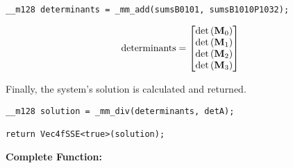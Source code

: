 \begin{verbatim}
__m128 determinants = _mm_add(sumsB0101, sumsB1010P1032);
\end{verbatim}


\begin{align*}
\mathrm{determinants} 
=
\begin{bmatrix}
\mathrm{det}\left(\mathbf{M}_0\right)\\
\mathrm{det}\left(\mathbf{M}_1\right)\\
\mathrm{det}\left(\mathbf{M}_2\right)\\
\mathrm{det}\left(\mathbf{M}_3\right)\\
\end{bmatrix}
\end{align*}

Finally, the system's solution is calculated and returned.

\begin{verbatim}
__m128 solution = _mm_div(determinants, detA);

return Vec4fSSE<true>(solution);
\end{verbatim}


\vspace{1cm}
\textbf{Complete Function:}

